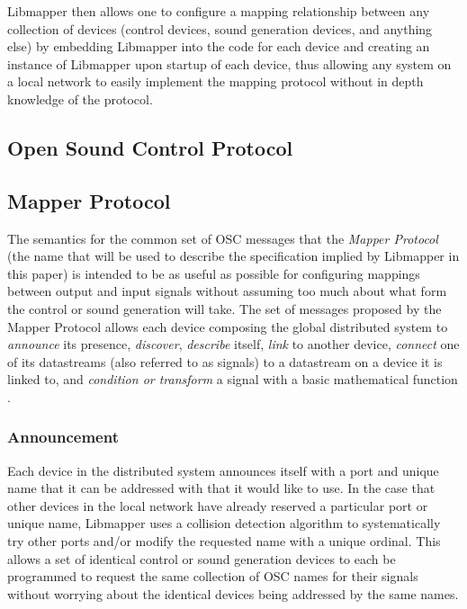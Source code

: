 Libmapper then allows one to configure a mapping relationship between any collection of devices (control devices, sound generation devices, and anything else) by embedding Libmapper into the code for each device and creating an instance of Libmapper upon startup of each device, thus allowing any system on a local network to easily implement the mapping protocol without in depth knowledge of the protocol.

\subsection{Open Sound Control Protocol}



\subsection{Mapper Protocol}

The semantics for the common set of OSC messages that the \emph{Mapper Protocol} (the name that will be used to describe the specification implied by Libmapper in this paper) is intended to be as useful as possible for configuring mappings between output and input signals without assuming too much about what form the control or sound generation will take. The set of messages proposed by the Mapper Protocol allows each device composing the global distributed system to \emph{announce} its presence, \emph{discover}, \emph{describe} itself, \emph{link} to another device, \emph{connect} one of its datastreams (also referred to as signals) to a datastream on a device it is linked to, and \emph{condition or transform} a signal with a basic mathematical function \cite{Malloch2009}.

\subsubsection{Announcement}

Each device in the distributed system announces itself with a port and unique name that it can be addressed with that it would like to use. In the case that other devices in the local network have already reserved a particular port or unique name, Libmapper uses a collision detection algorithm to systematically try other ports and/or modify the requested name with a unique ordinal. This allows a set of identical control or sound generation devices to each be programmed to request the same collection of OSC names for their signals without worrying about the identical devices being addressed by the same names.

